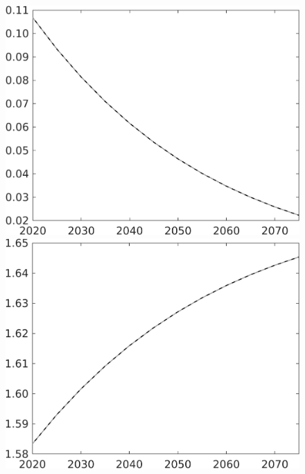 \documentclass[12pt]{article}
\begin{document}
\begin{figure}[h!!]
\begin{minipage}[]{0.32\textwidth}
	\end{minipage}	
	\begin{minipage}[]{0.32\textwidth}
		\includegraphics[width=1\textwidth]{../../codding_model/own_basedOnFried/optimalPol_010922_revision/figures/all_13Sept22/CompTaul_LFBAU_Reg0_pee_spillover0_nsk1_xgr1_knspil1_sep1_countec0_GovRev0_etaa0.79_lgd0.png}
	\end{minipage}	
	\begin{minipage}[]{0.32\textwidth}
		\includegraphics[width=1\textwidth]{../../codding_model/own_basedOnFried/optimalPol_010922_revision/figures/all_13Sept22/CompTaul_LFBAU_Reg0_pn_spillover0_nsk1_xgr1_knspil1_sep1_countec0_GovRev0_etaa0.79_lgd0.png}

\end{minipage}
\end{figure}
\end{document}
